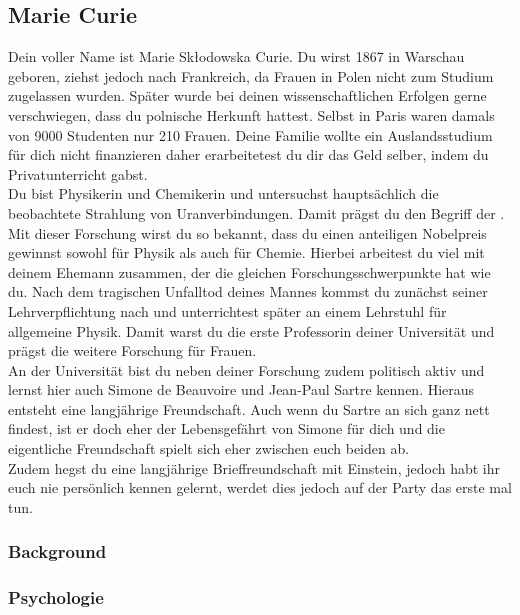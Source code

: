 \documentclass[12pt, a4paper, openany]{report}
\begin{document}
\subsection{Marie Curie}
Dein voller Name ist Marie Skłodowska Curie. Du wirst 1867 in Warschau geboren, ziehst jedoch nach Frankreich, da Frauen in Polen nicht zum Studium zugelassen wurden. Später wurde bei deinen wissenschaftlichen Erfolgen gerne verschwiegen, dass du polnische Herkunft hattest.
Selbst in Paris waren damals von 9000 Studenten nur 210 Frauen. Deine Familie wollte ein Auslandsstudium für dich nicht finanzieren daher erarbeitetest du dir das Geld selber, indem du Privatunterricht gabst.\\
Du bist Physikerin und Chemikerin und untersuchst hauptsächlich die beobachtete Strahlung von Uranverbindungen. Damit prägst du den Begriff der . Mit dieser Forschung wirst du so bekannt, dass du einen anteiligen Nobelpreis gewinnst sowohl für Physik als auch für Chemie. Hierbei arbeitest du viel mit deinem Ehemann zusammen, der die gleichen Forschungsschwerpunkte hat wie du. Nach dem tragischen Unfalltod deines Mannes kommst du zunächst seiner Lehrverpflichtung nach und unterrichtest später an einem Lehrstuhl für allgemeine Physik. Damit warst du die erste Professorin deiner Universität und prägst die weitere Forschung für Frauen. \\

An der Universität bist du neben deiner Forschung zudem politisch aktiv und lernst hier auch Simone de Beauvoire und Jean-Paul Sartre kennen. Hieraus entsteht eine langjährige Freundschaft. Auch wenn du Sartre an sich ganz nett findest, ist er doch eher der Lebensgefährt von Simone für dich und die eigentliche Freundschaft spielt sich eher zwischen euch beiden ab.\\

Zudem hegst du eine langjährige Brieffreundschaft mit Einstein, jedoch habt ihr euch nie persönlich kennen gelernt, werdet dies jedoch auf der Party das erste mal tun. 






\subsubsection{Background}

\subsubsection{Psychologie}
\end{document}
